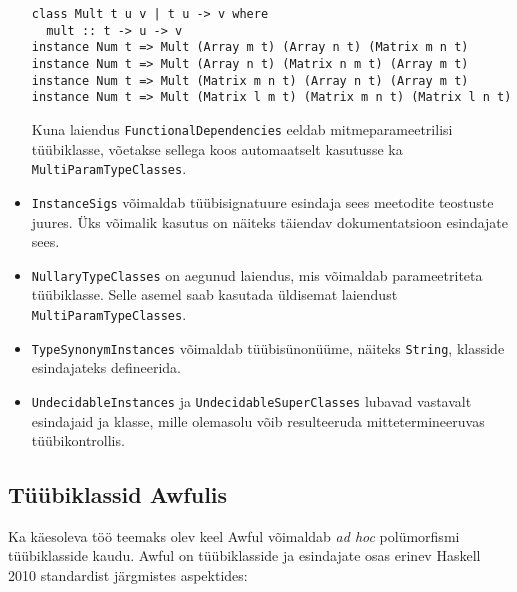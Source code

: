\documentclass[12pt]{article}
\begin{document}
\begin{itemize}
            \begin{verbatim}class Mult t u v | t u -> v where
  mult :: t -> u -> v
instance Num t => Mult (Array m t) (Array n t) (Matrix m n t)
instance Num t => Mult (Array n t) (Matrix n m t) (Array m t)
instance Num t => Mult (Matrix m n t) (Array n t) (Array m t)
instance Num t => Mult (Matrix l m t) (Matrix m n t) (Matrix l n t)\end{verbatim}

            Kuna laiendus \verb!FunctionalDependencies! eeldab mitmeparameetrilisi tüübiklasse, võetakse sellega koos automaatselt kasutusse ka \verb!MultiParamTypeClasses!.
          \item
            \verb!InstanceSigs! võimaldab tüübisignatuure esindaja sees meetodite teostuste juures. Üks võimalik kasutus on näiteks täiendav dokumentatsioon esindajate sees.
          \item
            \verb!NullaryTypeClasses! on aegunud laiendus, mis võimaldab parameetriteta tüübiklasse. Selle asemel saab kasutada üldisemat laiendust \verb!MultiParamTypeClasses!.
          \item
            \verb!TypeSynonymInstances! võimaldab tüübisünonüüme, näiteks \verb!String!, klasside esindajateks defineerida.
          \item
            \verb!UndecidableInstances! ja \verb!UndecidableSuperClasses! lubavad vastavalt esindajaid ja klasse, mille olemasolu võib resulteeruda mittetermineeruvas tüübikontrollis.
        \end{itemize}
    \subsection{Tüübiklassid Awfulis}\label{tyybiklassidawfulis}
      Ka käesoleva töö teemaks olev keel Awful võimaldab \textit{ad hoc} polümorfismi tüübiklasside kaudu. Awful on tüübiklasside ja esindajate osas erinev Haskell 2010 standardist järgmistes aspektides:
\end{document}
